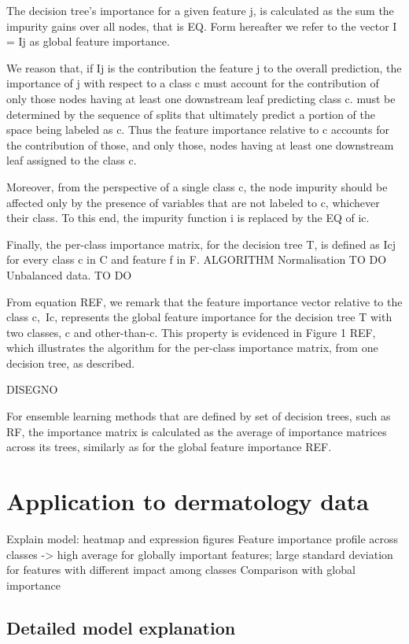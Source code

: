 \documentclass[12pt,a4paper]{article}
\theoremstyle{definition}
\theoremstyle{plain}
\theoremstyle{remark}
\begin{document}
The decision tree's importance for a given feature j, is calculated as the sum the impurity gains over all nodes, that is
EQ.
Form hereafter we refer to the vector I = Ij as global feature importance. 

We reason that, if Ij is the contribution the feature j to the overall prediction, the importance of j with respect to a class c must account for the contribution of only those nodes having at least one downstream leaf predicting class c.
must be determined by the sequence of splits that ultimately predict a portion of the space being labeled as c. Thus the feature importance relative to c accounts for the contribution of those, and only those, nodes having at least one downstream leaf assigned to the class c.

Moreover, from the perspective of a single class c, the node impurity should be affected only by the presence of variables that are not labeled to c, whichever their class. To this end, the impurity function i is replaced by the 
EQ of ic.

Finally, the per-class importance matrix, for the decision tree T, is defined as
Icj
for every class c in C and feature f in F.
ALGORITHM
Normalisation TO DO
Unbalanced data. TO DO

From equation REF, we remark that the feature importance vector relative to the class c, Ic, represents the global feature importance for the decision tree T with two classes, c and other-than-c. This property is evidenced in Figure 1 REF, which illustrates the algorithm for the per-class importance matrix, from one decision tree, as described.

DISEGNO

For ensemble learning methods that are defined by set of decision trees, such as RF, the importance matrix is calculated as the average of importance matrices across its trees, similarly as for the global feature importance REF.

\section{Application to dermatology data}\label{sec:matrix_rank}

Explain model: heatmap and expression figures
Feature importance profile across classes -> high average for globally important features; large standard deviation for features with different impact among classes
Comparison with global importance

\subsection{Detailed model explanation}\label{subsec:explanability}
\end{document}
